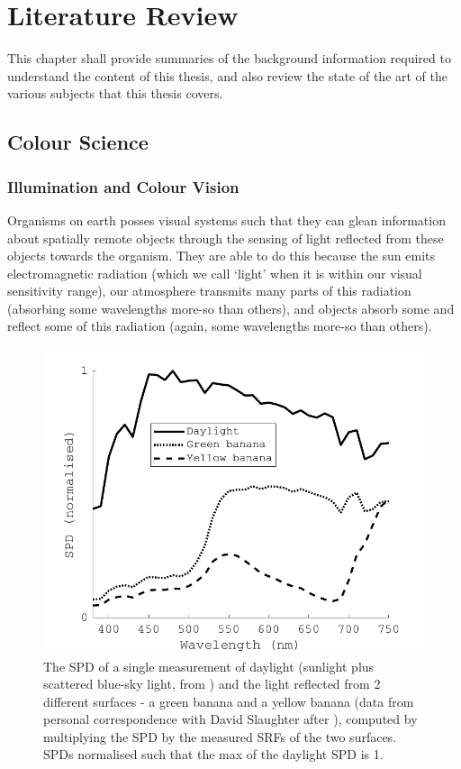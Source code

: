 \chapter{Literature Review}
\label{LitReview}

This chapter shall provide summaries of the background information required to understand the content of this thesis, and also review the state of the art of the various subjects that this thesis covers.

\section{Colour Science}

\subsection{Illumination and Colour Vision}

Organisms on earth posses visual systems such that they can glean information about spatially remote objects through the sensing of light reflected from these objects towards the organism. They are able to do this because the sun emits electromagnetic radiation (which we call `light' when it is within our visual sensitivity range), our atmosphere transmits many parts of this radiation (absorbing some wavelengths more-so than others), and objects absorb some and reflect some of this radiation (again, some wavelengths more-so than others).

\begin{figure}[htbp]
\includegraphics[max width=\textwidth]{figs/LitRev/daylightAndBananas.pdf}
\caption{The \gls{SPD} of a single measurement of daylight (sunlight plus scattered blue-sky light, from \citet{hernandez-andres_color_2001}) and the light reflected from 2 different surfaces - a green banana and a yellow banana (data from personal correspondence with David Slaughter after \citet{li_optical_1997}), computed by multiplying the \gls{SPD} by the measured \glspl{SRF} of the two surfaces. \Glspl{SPD} normalised such that the max of the daylight \gls{SPD} is 1.}
\label{fig:SPD}
\end{figure}

